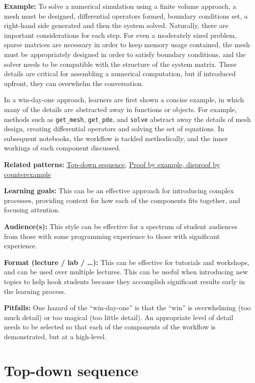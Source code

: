 \documentclass[]{book}
\begin{document}
\textbf{Example:}
To solve a numerical simulation using a finite volume approach, a mesh
must be designed, differential operators formed, boundary conditions
set, a right-hand side generated and then the system
solved. Naturally, there are important considerations for each
step. For even a moderately sized problem, sparse matrices are
necessary in order to keep memory usage contained, the mesh must be
appropriately designed in order to satisfy boundary conditions, and
the solver needs to be compatible with the structure of the system
matrix. These details are critical for assembling a numerical
computation, but if introduced upfront, they can overwhelm the
conversation.

In a win-day-one approach, learners are first shown a concise example,
in which many of the details are abstracted away in functions or
objects. For example, methods such as \texttt{get\_mesh}, \texttt{get\_pde}, and
\texttt{solve} abstract away the details of mesh design, creating
differential operators and solving the set of equations. In subsequent
notebooks, the workflow is tackled methodically, and the inner
workings of each component discussed.

\textbf{Related patterns:}
\protect\hyperlink{top-down-sequence}{Top-down sequence}, \protect\hyperlink{proof-by-example-disproof-by-counterexample}{Proof by example, disproof by counterexample}

\textbf{Learning goals:}
This can be an effective approach for introducing complex processes,
providing context for how each of the components fits together, and
focusing attention.

\textbf{Audience(s):}
This style can be effective for a spectrum of student audiences from
those with some programming experience to those with significant
experience.

\textbf{Format (lecture / lab / \ldots):}
This can be effective for tutorials and workshops, and can be used over
multiple lectures. This can be useful when introducing new topics to help hook
students because they accomplish significant results early in the learning
process.

\textbf{Pitfalls:}
One hazard of the ``win-day-one'' is that the ``win'' is overwhelming (too
much detail) or too magical (too little detail). An appropriate level
of detail needs to be selected so that each of the components of the
workflow is demonstrated, but at a high-level.

\hypertarget{top-down-sequence}{%
\section{Top-down sequence}\label{top-down-sequence}}
\end{document}
